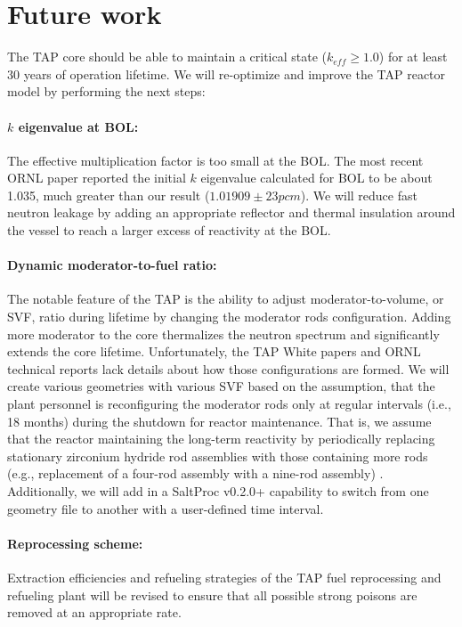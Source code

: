 \documentclass[12pt]{article} %
\begin{document}
\section{Future work}
The \gls{TAP} core should be able to maintain a critical state ($k_{eff}\geq 
1.0$) for at least 30 years of operation lifetime. We will re-optimize and 
improve the \gls{TAP} reactor model by performing the next steps:
\paragraph{$k$ eigenvalue at \gls{BOL}:} The effective multiplication factor 
is too small at the \gls{BOL}. The most recent \gls{ORNL} paper  
\cite{betzler_fuel_2018} reported the initial $k$ eigenvalue calculated 
for \gls{BOL} to be about 1.035, much greater than our result 
($1.01909\pm23pcm$). We will reduce fast neutron leakage by adding an 
appropriate reflector and thermal insulation around the vessel to reach a 
larger excess of reactivity at the \gls{BOL}.
\paragraph{Dynamic moderator-to-fuel ratio:} The notable feature of the 
\gls{TAP} is the ability to adjust moderator-to-volume, or \gls{SVF}, ratio 
during lifetime by changing the moderator rods configuration. Adding more 
moderator to the core thermalizes the neutron spectrum and significantly 
extends the core lifetime. Unfortunately, the \gls{TAP} White 
papers and \gls{ORNL} technical reports lack details about how those 
configurations are formed. We will create various geometries with various 
\gls{SVF} based on the assumption, that the plant personnel is reconfiguring 
the moderator rods only at regular intervals (i.e., 18 months) during the 
shutdown for reactor maintenance. That is, we assume that the reactor 
maintaining the long-term reactivity by periodically replacing stationary
zirconium hydride rod assemblies with those containing more rods (e.g., 
replacement of a four-rod assembly with a nine-rod assembly)  
\cite{betzler_fuel_2018}. Additionally, we will add in a SaltProc v0.2.0+ 
capability to switch from one geometry file to another with a user-defined 
time interval. 
\paragraph{Reprocessing scheme:} Extraction efficiencies and refueling 
strategies of the \gls{TAP} fuel reprocessing and refueling plant will be 
revised to ensure that all possible strong poisons are removed at an 
appropriate rate.




%

\end{document}
